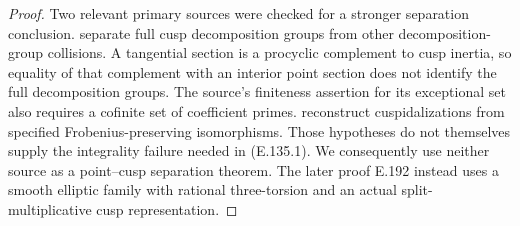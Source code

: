 \begin{proof}
Two relevant primary sources were checked for a
stronger separation conclusion.
\citet[Proposition~1.8, pp.~144--147, and Corollary~1.11, pp.~147--148]{AuditSaidiTamagawa2009}
separate full cusp decomposition groups from other
decomposition-group collisions. A tangential section
is a procyclic complement to cusp inertia, so equality
of that complement with an interior point section
does not identify the full decomposition groups.
The source's finiteness assertion for its exceptional
set also requires a cofinite set of coefficient primes.
\citet[Theorems~A--C, author pp.~2--4]{AuditWakabayashi2012}
reconstruct cuspidalizations from specified
Frobenius-preserving isomorphisms. Those hypotheses
do not themselves supply the integrality failure
needed in (E.135.1). We consequently use neither
source as a point--cusp separation theorem.
The later proof E.192 instead uses a smooth elliptic
family with rational three-torsion and an actual
split-multiplicative cusp representation.
\end{proof}

